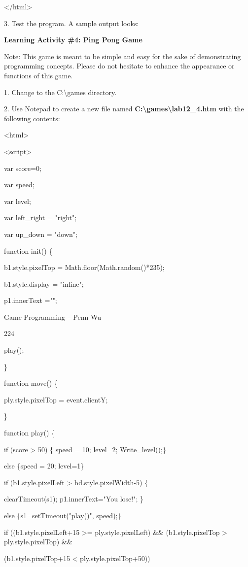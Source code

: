 \documentclass[
]{article}
\begin{document}
\textless/html\textgreater{}

3. Test the program. A sample output looks:

\textbf{Learning Activity \#4: Ping Pong Game}

Note: This game is meant to be simple and easy for the sake of
demonstrating programming concepts. Please do not hesitate to enhance
the appearance or functions of this game.

1. Change to the C:\textbackslash games directory.

2. Use Notepad to create a new file named
\textbf{C:\textbackslash games\textbackslash lab12\_4.htm} with the
following contents:

\textless html\textgreater{}

\textless script\textgreater{}

var score=0;

var speed;

var level;

var left\_right = "right";

var up\_down = "down";

function init() \{

b1.style.pixelTop = Math.floor(Math.random()*235);

b1.style.display = "inline";

p1.innerText ="";

Game Programming -- Penn Wu

224

\protect\hypertarget{index_split_011.htmlux5cux23p225}{}{}play();

\}

function move() \{

ply.style.pixelTop = event.clientY;

\}

function play() \{

if (score \textgreater{} 50) \{ speed = 10; level=2; Write\_level();\}

else \{speed = 20; level=1\}

if (b1.style.pixelLeft \textgreater{} bd.style.pixelWidth-5) \{

clearTimeout(s1); p1.innerText="You lose!"; \}

else \{s1=setTimeout("play()", speed);\}

if ((b1.style.pixelLeft+15 \textgreater= ply.style.pixelLeft) \&\&
(b1.style.pixelTop \textgreater{} ply.style.pixelTop) \&\&

(b1.style.pixelTop+15 \textless{} ply.style.pixelTop+50))
\end{document}
